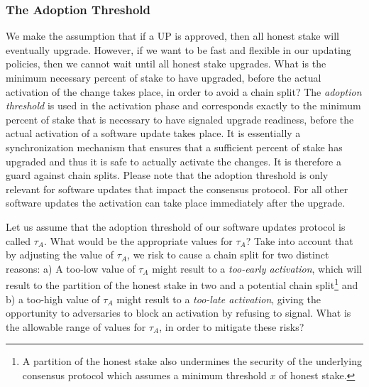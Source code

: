 
\subsubsection{The Adoption Threshold}
We make the assumption that if a UP is approved, then all honest stake will eventually upgrade. However, if we want to be fast and flexible in our updating policies, then we cannot wait until all honest stake upgrades. What is the minimum necessary percent of stake to have upgraded, before the actual activation of the change takes place, in order to avoid a chain split? The \emph{adoption threshold} is used in the activation phase and corresponds exactly to the minimum percent of stake that is necessary to have signaled upgrade readiness, before the actual activation of a software update takes place. It is essentially a synchronization mechanism that ensures that a sufficient percent of stake has upgraded and thus it is safe to actually activate the changes. It is therefore a guard against chain splits. Please note that the adoption threshold is only relevant for software updates that impact the consensus protocol. For all other software updates the activation can take place immediately after the upgrade.

Let us assume that the adoption threshold of our software updates protocol is called $\tau_A$. %
What would be the appropriate values for $\tau_A$? Take into account that by adjusting the value of $\tau_A$, we risk to cause a chain split for two distinct reasons: a) A too-low value of $\tau_A$ might result to a \emph{too-early activation}, which will result to the partition of the honest stake in two and a potential chain split\footnote{A partition of the honest stake also undermines the security of the underlying consensus protocol which assumes a minimum threshold $x$ of honest stake.}  and b) a too-high value of $\tau_A$ might result to a \emph{too-late activation}, giving the opportunity to adversaries to block an activation by refusing to signal. %
What is the allowable range of values for $\tau_A$, in order to mitigate these risks?

